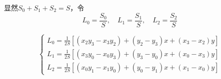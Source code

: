 \documentclass[a4paper,UTF8,titlepage]{ctexart}
\begin{document}

\begin{figure}[h]
	\centering
	\caption{}
	\label{1}
\end{figure}

显然$S_0 + S_1 + S_2 = S$，令
$$
L_0 = \frac{S_0}{S}, \quad L_1 = \frac{S_1}{S}, \quad L_2 = \frac{S_2}{S}
$$
\par

$$
\begin{cases}
	L_0 = \frac{1}{2S} [(x_2 y_3 - x_3 y_2) + (y_2 - y_3) x + (x_3 - x_2) y] \\
	L_1 = \frac{1}{2S} [(x_3 y_0 - x_0 y_3) + (y_3 - y_0) x + (x_0 - x_3) y] \\
	L_2 = \frac{1}{2S} [(x_0 y_1 - x_1 y_0) + (y_0 - y_1) x + (x_1 - x_0) y]
\end{cases} 
$$
\end{document}
